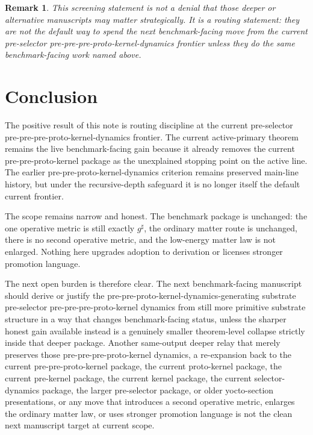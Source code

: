 \documentclass[11pt]{article}
\newcommand{\CompletedMetric}{g^{\sharp}}
\newtheorem{remark}{Remark}
\begin{document}
\begin{remark}
This screening statement is not a denial that those deeper or alternative manuscripts may matter strategically. It is a routing statement: they are not the default way to spend the next benchmark-facing move from the current pre-selector pre-pre-pre-proto-kernel-dynamics frontier unless they do the same benchmark-facing work named above.
\end{remark}

\section{Conclusion}

The positive result of this note is routing discipline at the current pre-selector pre-pre-pre-proto-kernel-dynamics frontier. The current active-primary theorem remains the live benchmark-facing gain because it already removes the current pre-pre-proto-kernel package as the unexplained stopping point on the active line. The earlier pre-pre-proto-kernel-dynamics criterion remains preserved main-line history, but under the recursive-depth safeguard it is no longer itself the default current frontier.

The scope remains narrow and honest. The benchmark package is unchanged: the one operative metric is still exactly \(\CompletedMetric\), the ordinary matter route is unchanged, there is no second operative metric, and the low-energy matter law is not enlarged. Nothing here upgrades adoption to derivation or licenses stronger promotion language.

The next open burden is therefore clear. The next benchmark-facing manuscript should derive or justify the pre-pre-proto-kernel-dynamics-generating substrate pre-selector pre-pre-pre-proto-kernel dynamics from still more primitive substrate structure in a way that changes benchmark-facing status, unless the sharper honest gain available instead is a genuinely smaller theorem-level collapse strictly inside that deeper package. Another same-output deeper relay that merely preserves those pre-pre-pre-proto-kernel dynamics, a re-expansion back to the current pre-pre-proto-kernel package, the current proto-kernel package, the current pre-kernel package, the current kernel package, the current selector-dynamics package, the larger pre-selector package, or older yocto-section presentations, or any move that introduces a second operative metric, enlarges the ordinary matter law, or uses stronger promotion language is not the clean next manuscript target at current scope.
\end{document}
